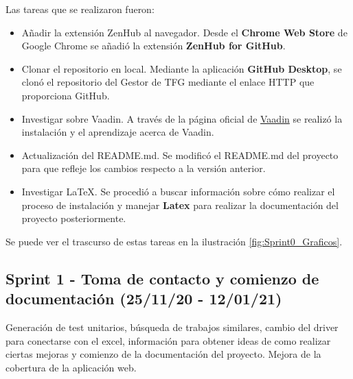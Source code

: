 Las tareas que se realizaron fueron:
\begin{itemize}
	\item Añadir la extensión ZenHub al navegador. 
		Desde el \textbf{Chrome Web Store} de Google Chrome se añadió la extensión \textbf{ZenHub for GitHub}.
	\item Clonar el repositorio en local.  
		Mediante la aplicación \textbf{GitHub Desktop}, se clonó el repositorio del Gestor de TFG mediante el enlace HTTP que proporciona GitHub.
	\item Investigar sobre Vaadin.
		A través de la página oficial de \href{https://vaadin.com/}{Vaadin} se realizó la instalación y el aprendizaje acerca de Vaadin.
	\item Actualización del README.md. 
		Se modificó el README.md del proyecto para que refleje los cambios respecto a la versión anterior. 
	\item Investigar LaTeX. 
		Se procedió a buscar información sobre cómo realizar el proceso de instalación y manejar \textbf{Latex} para realizar la documentación del proyecto posteriormente.
\end{itemize}

Se puede ver el trascurso de estas tareas en la ilustración \ref{fig:Sprint0_Graficos}.


\subsection{Sprint 1 - Toma de contacto y comienzo de documentación (25/11/20 - 12/01/21)}
Generación de test unitarios, búsqueda de trabajos similares, cambio del driver para conectarse con el excel, información para obtener ideas de como realizar ciertas mejoras y comienzo de la documentación del proyecto. Mejora de la cobertura de la aplicación web.

